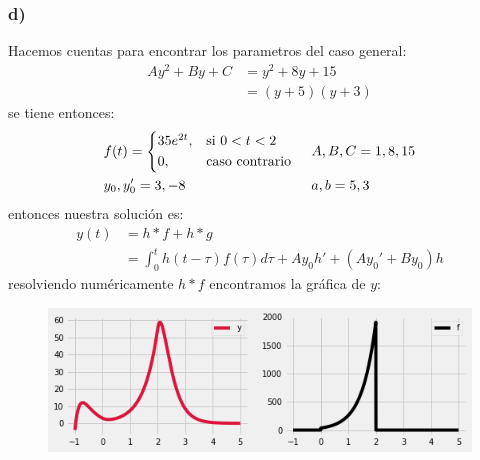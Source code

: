 \documentclass{article}
\begin{document}
\begin{tcolorbox}[breakable]
    \subsubsection*{d)}
    Hacemos cuentas para encontrar los parametros del caso general:
    \begin{align*}
        Ay^2 + By + C 
        &= y^2 + 8y + 15 \\
        &= (y+5)(y+3)
    \end{align*}
    se tiene entonces:
    \begin{align*}
        &f(t) = 
        \begin{cases*}
            35e^{2t}, & si $0<t<2$ \\
            0,& caso contrario
        \end{cases*}
        &&A, B, C = 1,8,15 \\
        &y_0, y_0' = 3,-8
        &&a,b = 5,3 
    \end{align*}
    entonces nuestra solución es:
    \begin{align*}
        y(t) 
        &= h*f + h*g \\
        &= \int_{0}^t h(t-\tau)f(\tau)d\tau + Ay_0h' + (Ay_0'+By_0)h 
    \end{align*}
    resolviendo numéricamente $h*f$ encontramos la gráfica de $y$:
    \begin{figure}[H]
        \centering
        \includegraphics[scale=0.7]{images/p1_4.png}
    \end{figure}
\end{tcolorbox}
\newpage
\end{document}

